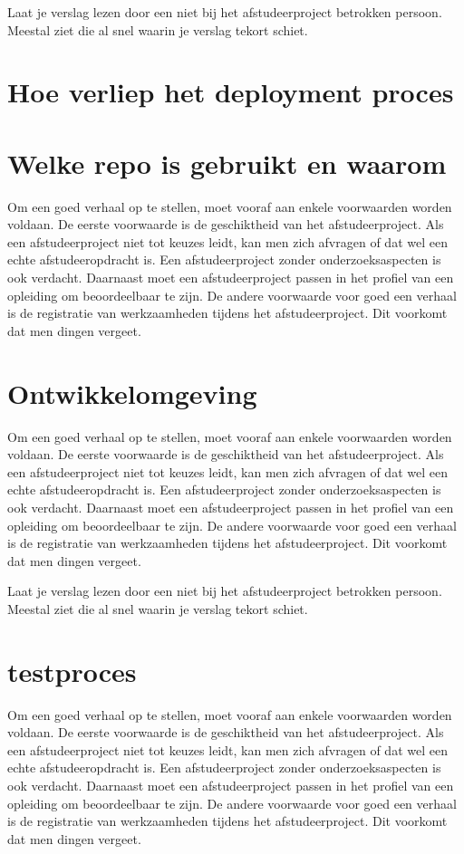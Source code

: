 		
		Laat je verslag lezen door een niet bij het afstudeerproject betrokken
		persoon. Meestal ziet die al snel waarin je verslag tekort schiet.
		\section{Hoe verliep het deployment proces}
		\section{Welke repo is gebruikt en waarom}
		Om een goed verhaal op te stellen, moet vooraf aan enkele voorwaarden
		worden voldaan. De eerste voorwaarde is de geschiktheid van het
		afstudeerproject. Als een afstudeerproject niet tot keuzes leidt, kan
		men zich afvragen of dat wel een echte afstudeeropdracht is. Een
		afstudeerproject zonder onderzoeksaspecten is ook verdacht. Daarnaast
		moet een afstudeerproject passen in het profiel van een opleiding om
		beoordeelbaar te zijn. De andere voorwaarde voor goed een verhaal is
		de registratie van werkzaamheden tijdens het afstudeerproject. Dit
		voorkomt dat men dingen vergeet.
		\section{Ontwikkelomgeving}
		Om een goed verhaal op te stellen, moet vooraf aan enkele voorwaarden
		worden voldaan. De eerste voorwaarde is de geschiktheid van het
		afstudeerproject. Als een afstudeerproject niet tot keuzes leidt, kan
		men zich afvragen of dat wel een echte afstudeeropdracht is. Een
		afstudeerproject zonder onderzoeksaspecten is ook verdacht. Daarnaast
		moet een afstudeerproject passen in het profiel van een opleiding om
		beoordeelbaar te zijn. De andere voorwaarde voor goed een verhaal is
		de registratie van werkzaamheden tijdens het afstudeerproject. Dit
		voorkomt dat men dingen vergeet.
		
		
		Laat je verslag lezen door een niet bij het afstudeerproject betrokken
		persoon. Meestal ziet die al snel waarin je verslag tekort schiet.
		\section{testproces}
		Om een goed verhaal op te stellen, moet vooraf aan enkele voorwaarden
		worden voldaan. De eerste voorwaarde is de geschiktheid van het
		afstudeerproject. Als een afstudeerproject niet tot keuzes leidt, kan
		men zich afvragen of dat wel een echte afstudeeropdracht is. Een
		afstudeerproject zonder onderzoeksaspecten is ook verdacht. Daarnaast
		moet een afstudeerproject passen in het profiel van een opleiding om
		beoordeelbaar te zijn. De andere voorwaarde voor goed een verhaal is
		de registratie van werkzaamheden tijdens het afstudeerproject. Dit
		voorkomt dat men dingen vergeet.
